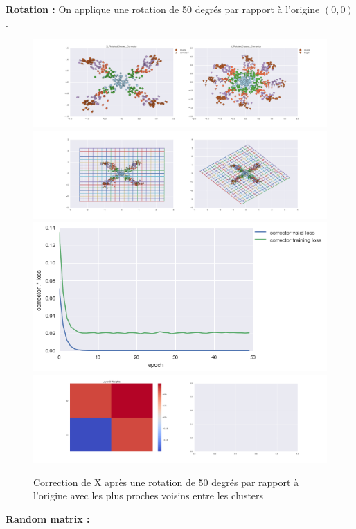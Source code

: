 
{\Large \textbf{Rotation :}} On applique une rotation de 50 degrés par rapport à l'origine $(0,0)$.

\begin{figure}[H] %
\centering
\includegraphics[width=\linewidth]{fig/24-05-2016/X/X_RotatedCluster_Corrector-DATA.png}
\includegraphics[width=\linewidth]{fig/24-05-2016/X/X_RotatedCluster_Corrector-GridCheck.png}
\includegraphics[width=0.45\linewidth]{fig/24-05-2016/X/X_RotatedCluster_Corrector-Learning_curve.png}
\includegraphics[width=\linewidth]{fig/24-05-2016/X/X_RotatedCluster_Corrector-W.png}
\caption{Correction de X après une rotation de 50 degrés par rapport à l'origine avec les plus proches voisins entre les clusters}
\label{fig:recap-X-rot-cluster}
\end{figure}

{\Large \textbf{Random matrix :}}

